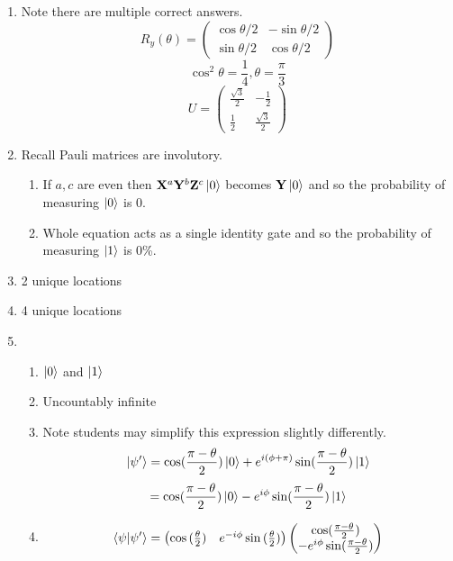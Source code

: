 \documentclass[12pt]{article}
\begin{document}
\begin{enumerate}[font=\bfseries]
    \item Note there are multiple correct answers.
    \[R_y(\theta) = \begin{pmatrix} \cos{\theta/2} & -\sin{\theta/2} \\
        \sin{\theta/2} & \cos{\theta/2}
        \end{pmatrix}\]
        \[\cos^2{\theta} = \frac{1}{4}, \theta = \frac{\pi}{3}\]
        \[U = \begin{pmatrix} 
        \frac{\sqrt{3}}{2} & -\frac{1}{2} \\
        \frac{1}{2} & \frac{\sqrt{3}}{2}
            \end{pmatrix}
        \]
    \item Recall Pauli matrices are involutory.
        \begin{enumerate}
            \item If $a,c$ are even then $\mathbf{X}^a\mathbf{Y}^b\mathbf{Z}^c\ket{0}$ becomes $\mathbf{Y}\ket{0}$ and so the probability of measuring $\ket{0}$ is 0. 
            \item Whole equation acts as a single identity gate and so the probability of measuring $\ket{1}$ is 0\%.
        \end{enumerate}
    \item 2 unique locations
    \item 4 unique locations
    \item \begin{enumerate}
        \item $\ket{0}$ and $\ket{1}$
        \item Uncountably infinite
        \item Note students may simplify this expression slightly differently.
        \[ \ket{\psi'} = \cos({\frac{\pi - \theta}{2})\ket{0}+e^{i(\phi + \pi)}\sin({\frac{\pi - \theta}{2}})\ket{1}}
        \]
        \[
        = \cos({\frac{\pi - \theta}{2})\ket{0}-e^{i\phi}\sin({\frac{\pi - \theta}{2}})\ket{1}}
        \]
        \item 
        \[
        \braket{\psi|\psi'} = 
        \begin{pmatrix}
            \cos{(\frac{\theta}{2})} & e^{-i\phi}\sin{(\frac{\theta}{2})}
        \end{pmatrix}
        \begin{pmatrix}
            \cos({\frac{\pi-\theta}{2})} \\
            -e^{i\phi}\sin({\frac{\pi - \theta}{2}})
        \end{pmatrix}
        \]

\end{enumerate}
\end{enumerate}
\end{document}
